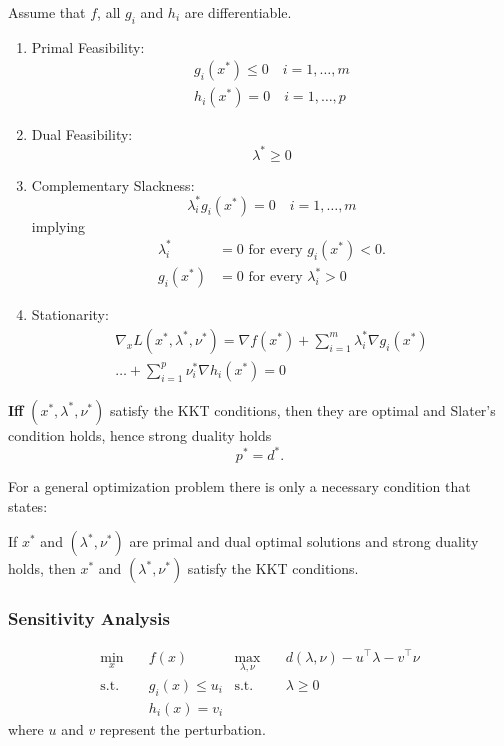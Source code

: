 Assume that $f$, all $g_i$ and $h_i$ are differentiable.
\begin{enumerate}
    \item Primal Feasibility:
          \begin{gather*}
              g_i(x^*) \leq 0 \quad i = 1, \ldots, m \\
              h_i(x^*) = 0 \quad i = 1, \ldots, p
          \end{gather*}
    \item Dual Feasibility:
          \begin{equation*}
              \lambda^* \geq 0
          \end{equation*}
    \item Complementary Slackness:
          \begin{equation*}
              \lambda_i^*g_i(x^*)=0 \quad i = 1, \ldots, m
          \end{equation*}
          implying
          \begin{align*}
              \lambda_{i}^{*} & =0\text{ for every }g_{i}(x^{*})<0.   \\
              g_{i}(x^{*})    & =0\text{ for every }\lambda_{i}^{*}>0
          \end{align*}
    \item Stationarity:
          \begin{align*}
              \nabla_x L(x^*, \lambda^*, \nu^*) =\nabla f(x^*) +\sum_{i=1}^{m}\lambda_i^*\nabla g_i(x^*) \\
              \ldots+\sum_{i=1}^{p}\nu_i^*\nabla h_i(x^*) = 0
          \end{align*}
\end{enumerate}

\newpar{}

\textbf{Iff} $(x^*,\lambda^*,\nu^*)$ satisfy the KKT conditions, then they are optimal and Slater's condition holds, hence strong duality holds\begin{equation*}
    p^*=d^*.
\end{equation*}

\newpar{}

For a general optimization problem there is only a necessary condition that states:

If $x^*$ and $(\lambda^*,\nu^*)$ are primal and dual optimal solutions and strong duality holds, then $x^*$ and $(\lambda^*,\nu^*)$ satisfy the KKT conditions.


\subsubsection{Sensitivity Analysis}
\noindent
\begin{align*}
    \min_{x} \quad   & f(x)            & \max_{\lambda,\nu}\quad & d(\lambda,\nu) - u^\top \lambda - v^\top \nu \\
    \text{s.t.}\quad & g_i(x) \leq u_i & \text{s.t.}\quad        & \lambda \geq 0                               \\
                     & h_i(x) = v_i
\end{align*}
where $u$ and $v$ represent the perturbation.


